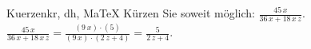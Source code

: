 \begin{MAufgabe}{Kuerzen}{kr, dh, MaTeX}
K\"urzen Sie soweit m\"oglich: $\frac{45\, x}{36\, x + 18\, x\, z}$.\\ 
\ifLsg\MLoesung
\quad $\frac{45\, x}{36\, x + 18\, x\, z}=\frac{(9\, x)\cdot(5)}{(9\, x)\cdot(2\, z + 4)}=\frac{5}{2\, z + 4}$.\else\relax\fi
 \end{MAufgabe}
